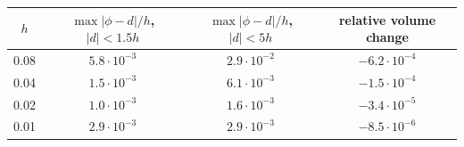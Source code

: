 \begin{tabular}{cccc}
\toprule
$h$ & $\max|\phi-d|/h$, $|d|<1.5h$ & $\max|\phi-d|/h$, $|d|<5h$ & relative volume change \\
\midrule
0.08 & $5.8\cdot 10^{-3}$ & $2.9\cdot 10^{-2}$ & $-6.2\cdot 10^{-4}$ \\
0.04 & $1.5\cdot 10^{-3}$ & $6.1\cdot 10^{-3}$ & $-1.5\cdot 10^{-4}$ \\
0.02 & $1.0\cdot 10^{-3}$ & $1.6\cdot 10^{-3}$ & $-3.4\cdot 10^{-5}$ \\
0.01 & $2.9\cdot 10^{-3}$ & $2.9\cdot 10^{-3}$ & $-8.5\cdot 10^{-6}$ \\
\bottomrule
\end{tabular}
